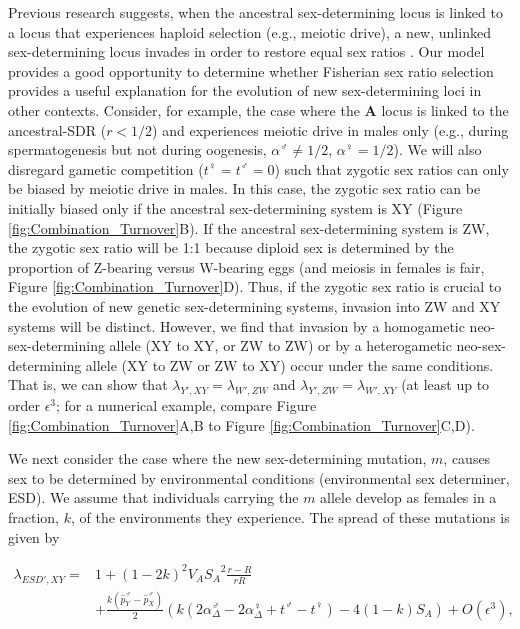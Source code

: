 \documentclass[12pt]{article}
\begin{document}
Previous research suggests, when the ancestral sex-determining locus is linked to a locus that experiences haploid selection (e.g., meiotic drive), a new, unlinked sex-determining locus invades in order to restore equal sex ratios \citep{Kozielska:2010vm}. 
Our model provides a good opportunity to determine whether Fisherian sex ratio selection provides a useful explanation for the evolution of new sex-determining loci in other contexts. 
Consider, for example, the case where the \textbf{A} locus is linked to the ancestral-SDR ($r<1/2$) and experiences meiotic drive in males only (e.g., during spermatogenesis but not during oogenesis, $\alpha^\male \neq 1/2$, $\alpha^\female=1/2$). 
We will also disregard gametic competition ($t^\female=t^\male=0$) such that zygotic sex ratios can only be biased by meiotic drive in males. 
In this case, the zygotic sex ratio can be initially biased only if the ancestral sex-determining system is XY (Figure \ref{fig:Combination_Turnover}B). 
If the ancestral sex-determining system is ZW, the zygotic sex ratio will be 1:1 because diploid sex is determined by the proportion of Z-bearing versus W-bearing eggs (and meiosis in females is fair, Figure \ref{fig:Combination_Turnover}D).
Thus, if the zygotic sex ratio is crucial to the evolution of new genetic sex-determining systems, invasion into ZW and XY systems will be distinct. 
However, we find that invasion by a homogametic neo-sex-determining allele (XY to XY, or ZW to ZW) or by a heterogametic neo-sex-determining allele (XY to ZW or ZW to XY) occur under the same conditions. 
That is, we can show that $\lambda_{Y',XY}=\lambda_{W',ZW}$ and $\lambda_{Y',ZW}=\lambda_{W',XY}$ (at least up to order $\epsilon^3$; for a numerical example, compare Figure \ref{fig:Combination_Turnover}A,B to Figure \ref{fig:Combination_Turnover}C,D).

We next consider the case where the new sex-determining mutation, $m$, causes sex to be determined by environmental conditions (environmental sex determiner, ESD). 
We assume that individuals carrying the $m$ allele develop as females in a fraction, $k$, of the environments they experience. 
The spread of these mutations is given by 

\begin{equation}
\begin{split}
\lambda_{ESD',XY} =& 1 + (1-2k)^2V_{A}{S_{A}}^2\frac{r-R}{r R} \\
&+\frac{k(\hat{p}^\male_Y-\hat{p}^\male_X)}{2}\left(k\left(2\alpha_{\Delta}^\male-2\alpha_{\Delta}^\female+t^\male-t^\female \right) -4(1-k)S_{A}\right)+O\left(\epsilon^3\right),
\end{split}
\label{eq:lambda_ESD_k}
\end{equation}
\end{document}
